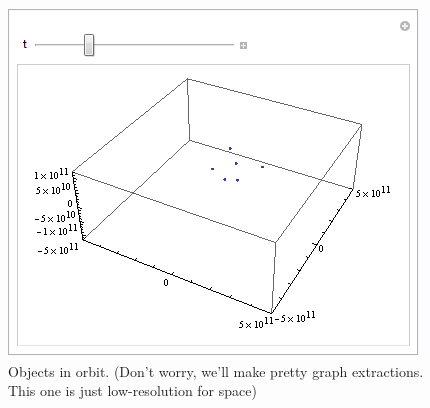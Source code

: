 \documentclass{article}
\begin{document}
\begin{figure}
\includegraphics[scale=.85]{orbit.png}
\caption{Objects in orbit. (Don't worry, we'll make pretty graph extractions. This one is just low-resolution for space)}
\label{fig:orbit}
\end{figure}
\end{document}
